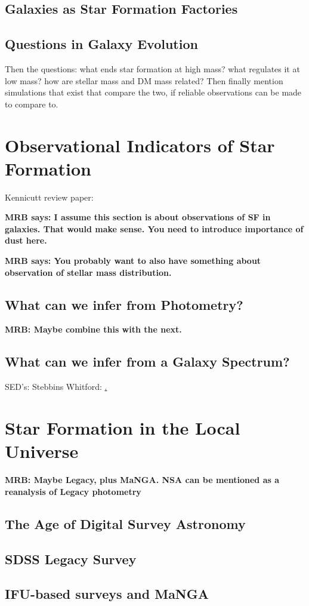 \subsection{Galaxies as Star Formation Factories}




\subsection{Questions in Galaxy Evolution}
{Then the questions: what ends star formation at high mass?
what  regulates it at low mass? how are 
stellar mass and DM mass related? Then finally mention
simulations that exist that compare the two, if reliable
observations can be made to compare to.}

\section{Observational Indicators of Star Formation}

Kennicutt review paper: 

{\bf MRB says: I assume this section is about observations 
of SF in galaxies. That would make sense. You need to 
introduce importance of dust here.}

{\bf MRB says: You probably want to also have something
about observation of stellar mass distribution.}

\subsection{What can we infer from Photometry?}

{\bf MRB: Maybe combine this with the next.}

\subsection{What can we infer from a Galaxy Spectrum?}

SED's: Stebbins Whitford: \href{http://adsabs.harvard.edu/abs/1968ApJ...154...21O}.

\section{Star Formation in the Local Universe}

{\bf MRB: Maybe Legacy, plus MaNGA. NSA can be mentioned
as a reanalysis of Legacy photometry}

\subsection{The Age of Digital Survey Astronomy}

\subsection{SDSS Legacy Survey}

\subsection{IFU-based surveys and MaNGA}

\section{}



